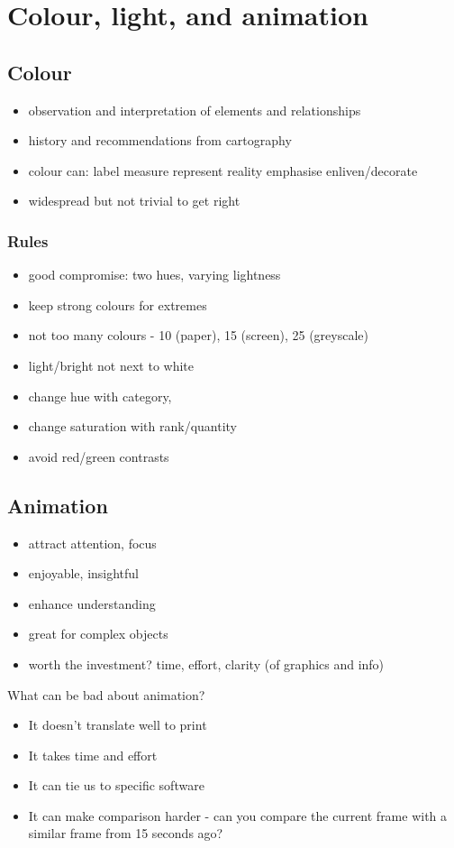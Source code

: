 \section{Colour, light, and animation}
\subsection{Colour}
\begin{itemize}
	\item observation and interpretation of elements and relationships
	\item history and recommendations from cartography
	\item colour can:
	\subitem label
	\subitem measure
	\subitem represent reality
	\subitem emphasise
	\subitem enliven/decorate
	\item widespread
	\subitem but not trivial to get right	
\end{itemize}

\subsubsection{Rules}
\begin{itemize}
	\item good compromise: two hues, varying lightness
	\item keep strong colours for extremes
	\item not too many colours - 10 (paper), 15 (screen), 25 (greyscale)
	\item light/bright not next to white
	\item change hue with category,
	\item change saturation with rank/quantity
	\item avoid red/green contrasts	
\end{itemize}

\subsection{Animation}
\begin{itemize}
	\item attract attention, focus
	\item enjoyable, insightful
	\item enhance understanding
	\item great for complex objects
	\item worth the investment?
	\subitem time, effort, clarity (of graphics and info)	
\end{itemize}
What can be bad about animation?
\begin{itemize}
	\item It doesn't translate well to print
	\item It takes time and effort
	\item It can tie us to specific software
	\item It can make comparison harder - can you compare the current frame with a similar frame from 15 seconds ago?	
\end{itemize}
